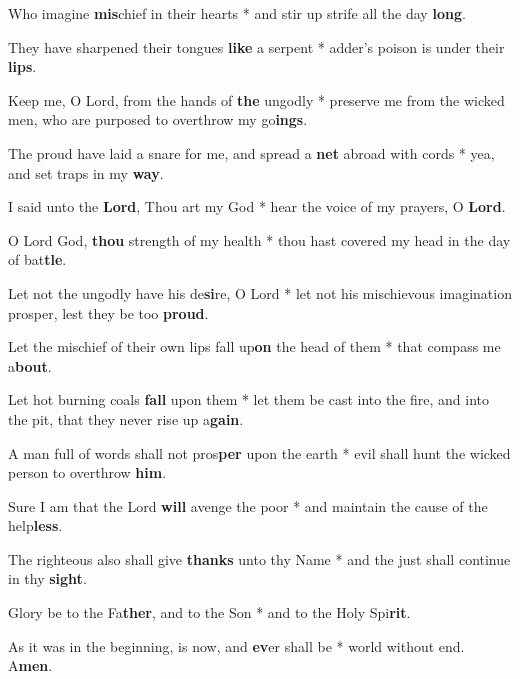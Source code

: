 \begin{multicols}{2}
	Who imagine \textbf{mis}chief in their hearts * and stir up strife all the day \textbf{long}.
	
	They have sharpened their tongues \textbf{like} a serpent * adder's poison is under their \textbf{lips}.
	
	Keep me, O Lord, from the hands of \textbf{the} ungodly * preserve me from the wicked men, who are purposed to overthrow my go\textbf{ings}.
	
	The proud have laid a snare for me, and spread a \textbf{net} abroad with cords * yea, and set traps in my \textbf{way}.
	
	I said unto the \textbf{Lord}, Thou art my God * hear the voice of my prayers, O \textbf{Lord}.
	
	O Lord God, \textbf{thou} strength of my health * thou hast covered my head in the day of bat\textbf{tle}.
	
	Let not the ungodly have his de\textbf{si}re, O Lord * let not his mischievous imagination prosper, lest they be too \textbf{proud}.
	
	Let the mischief of their own lips fall up\textbf{on} the head of them * that compass me a\textbf{bout}.
	
	Let hot burning coals \textbf{fall} upon them * let them be cast into the fire, and into the pit, that they never rise up a\textbf{gain}.
	
	A man full of words shall not pros\textbf{per} upon the earth * evil shall hunt the wicked person to overthrow \textbf{him}.
	
	Sure I am that the Lord \textbf{will} avenge the poor * and maintain the cause of the help\textbf{less}.
	
	The righteous also shall give \textbf{thanks} unto thy Name * and the just shall continue in thy \textbf{sight}.
	
	Glory be to the Fa\textbf{ther}, and to the Son * and to the Holy Spi\textbf{rit}.
	
	As it was in the beginning, is now, and \textbf{ev}er shall be * world without end. A\textbf{men}.
\end{multicols}